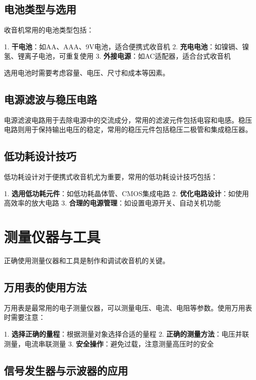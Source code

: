 \documentclass[12pt,UTF8]{ctexbook}
\begin{document}
\section{电池类型与选用}

收音机常用的电池类型包括：

1. \textbf{干电池}：如AA、AAA、9V电池，适合便携式收音机
2. \textbf{充电电池}：如镍镉、镍氢、锂离子电池，可重复使用
3. \textbf{外接电源}：如AC适配器，适合台式收音机

选用电池时需要考虑容量、电压、尺寸和成本等因素。

\section{电源滤波与稳压电路}

电源滤波电路用于去除电源中的交流成分，常用的滤波元件包括电容和电感。稳压电路则用于保持输出电压的稳定，常用的稳压元件包括稳压二极管和集成稳压器。

\section{低功耗设计技巧}

低功耗设计对于便携式收音机尤为重要，常用的低功耗设计技巧包括：

1. \textbf{选用低功耗元件}：如低功耗晶体管、CMOS集成电路
2. \textbf{优化电路设计}：如使用高效率的放大电路
3. \textbf{合理的电源管理}：如设置电源开关、自动关机功能

\chapter{测量仪器与工具}

正确使用测量仪器和工具是制作和调试收音机的关键。

\section{万用表的使用方法}

万用表是最常用的电子测量仪器，可以测量电压、电流、电阻等参数。使用万用表时需要注意：

1. \textbf{选择正确的量程}：根据测量对象选择合适的量程
2. \textbf{正确的测量方法}：电压并联测量，电流串联测量
3. \textbf{安全操作}：避免过载，注意测量高压时的安全

\section{信号发生器与示波器的应用}
\end{document}
